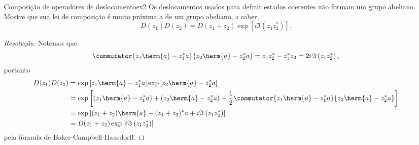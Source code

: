\begin{exercício}{Composição de operadores de deslocamento}{ex2}
   Os deslocamentos usados para definir estados coerentes não formam um grupo abeliano. Mostre que sua lei de composição é muito próxima a de um grupo abeliano, a saber,
   \begin{equation*}
      D(z_1) D(z_2) = D(z_1 + z_2) \exp\left[i \Im(z_1 z_2^*)\right].
   \end{equation*}
\end{exercício}
\begin{proof}[Resolução]
   Notemos que
   \begin{equation*}
      \commutator{z_1 \herm{a} - z_1^* a}{z_2 \herm{a} - z_2^* a} = z_1 z_2^* -  z_1^* z_2 = 2i \Im\left(z_1 z_2^*\right),
   \end{equation*}
   portanto
   \begin{align*}
      D(z_1)D(z_2) &= \exp\left[z_1 \herm{a} - z_1^* a\right]\exp\left[z_2 \herm{a} - z_2^* a\right]\\
                   &= \exp\left[\left(z_1 \herm{a} - z_1^* a\right) + \left(z_2 \herm{a} - z_2^* a\right) + \frac12\commutator{z_1 \herm{a} - z_1^* a}{z_2 \herm{a} - z_2^* a} \right]\\
                   &= \exp\left[(z_1 + z_2) \herm{a} - (z_1 + z_2)^* a + i \Im\left(z_1 z_2^*\right)\right]\\
                   &= D(z_1 + z_2) \exp\left[i \Im\left(z_1 z_2^*\right)\right]
   \end{align*}
   pela fórmula de Baker-Campbell-Hausdorff.
\end{proof}
